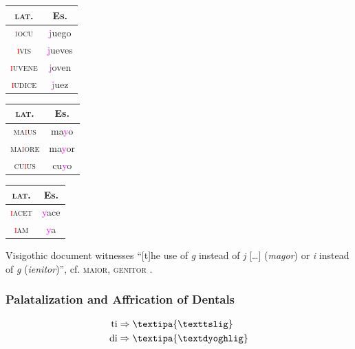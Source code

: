 \documentclass{report}[12pt]
\begin{document}
\begin{tabular}{c c}
  \textsc{lat.} & Es. \\
  \hline
  \textsc{\textcolor{red}{i}ocu} & \textcolor{magenta}{j}uego \quad [x] \\
  \textsc{\textcolor{red}{i}vis} & \textcolor{magenta}{j}ueves \quad [x] \\
  \textsc{\textcolor{red}{i}uvene} & \textcolor{magenta}{j}oven \quad [x] \\
  \textsc{\textcolor{red}{i}udice} & \textcolor{magenta}{j}uez \quad [x] \\
\end{tabular}

\begin{tabular}{c c}
  \textsc{lat.} & Es. \\
  \hline
  \textsc{ma\textcolor{red}{i}us} & ma\textcolor{magenta}{y}o \\
  \textsc{ma\textcolor{red}{i}ore} & ma\textcolor{magenta}{y}or \\
  \textsc{cu\textcolor{red}{i}us} & cu\textcolor{magenta}{y}o \\
\end{tabular}

\begin{tabular}{c c}
  \textsc{lat.} & Es. \\
  \hline
  \textsc{\textcolor{red}{i}acet} & \textcolor{magenta}{y}ace \\
  \textsc{\textcolor{red}{i}am} & \textcolor{magenta}{y}a \\
\end{tabular}

Visigothic document witnesses ``[t]he use of \emph{g} instead of \emph{j} [\dots] (\emph{magor}) or \emph{i} instead of \emph{g} (\emph{ienitor})'', cf. \textsc{maior}, \textsc{genitor} \parencite[p.~159]{latin_palaeography}.

\subsubsection{Palatalization and Affrication of Dentals}\label{sec:dental_palatalization}

\begin{tcolorbox}
  \begin{align*}
    \text{ti} & \Rightarrow \text{\textipa{\texttslig}} \\
    \text{di} & \Rightarrow \text{\textipa{\textdyoghlig}} \\
  \end{align*}
\end{tcolorbox}
\end{document}
